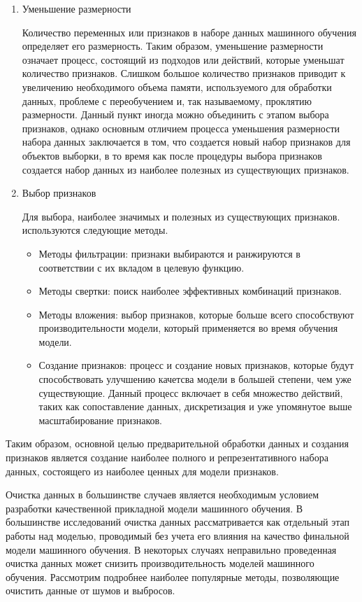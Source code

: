 \documentclass[12pt,a4paper, oneside]{extreport}
\begin{document}
\begin{enumerate}
\item  Уменьшение размерности

Количество переменных или признаков в наборе данных машинного обучения определяет его размерность. Таким образом, уменьшение размерности означает процесс, состоящий из подходов или действий, которые уменьшат количество признаков. Слишком большое количество признаков  приводит к увеличению необходимого  объема памяти, используемого  для обработки данных, проблеме с переобучением и, так называемому,  проклятию размерности. Данный пункт иногда можно объединить с этапом выбора  признаков, однако основным отличием процесса уменьшения  размерности набора данных заключается в том, что  создается  новый набор признаков для объектов выборки, в то время как после процедуры выбора признаков создается набор данных из наиболее полезных из существующих признаков. 

\item  Выбор признаков 

Для выбора, наиболее  значимых и полезных из существующих признаков. используются  следующие методы.

\begin{itemize}
	\item Методы фильтрации:  признаки выбираются и ранжируются в соответствии с их вкладом в целевую функцию.
	\item  Методы свертки: поиск наиболее эффективных комбинаций признаков.
	\item Методы вложения: выбор признаков, которые больше всего способствуют производительности модели, который применяется во время  обучения модели.
	\item Создание признаков:  процесс и создание новых признаков, которые будут способствовать улучшению качетсва модели в большей степени, чем уже существующие. Данный процесс включает в себя множество действий, таких как сопоставление данных, дискретизация и уже упомянутое  выше масштабирование признаков. 
\end{itemize}

\end{enumerate}

Таким образом, основной целью предварительной  обработки данных и создания признаков является создание наиболее полного и репрезентативного  набора данных, состоящего   из наиболее ценных для модели признаков.


Очистка данных в большинстве случаев является необходимым условием разработки качественной прикладной модели  машинного обучения. В большинстве исследований очистка данных рассматривается как отдельный этап работы над моделью, проводимый без учета  его влияния на качество финальной модели машинного обучения. В некоторых случаях неправильно проведенная  очистка данных может снизить производительность моделей машинного обучения.
Рассмотрим подробнее наиболее популярные методы, позволяющие очистить данные от шумов и выбросов. 
\end{document}
